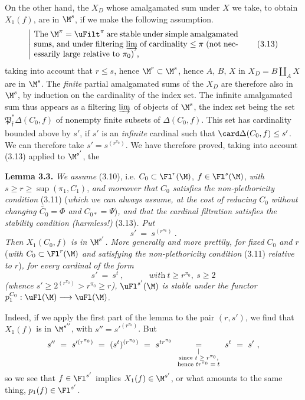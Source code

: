 On the other hand, the $X_D$ whose amalgamated sum under $X$ we take, to obtain $X_1(f)$, are in $\M^s$, if we make the following assumption. 
\[
\left|\ \parbox{0.72\linewidth}{The $\M^\pi=\uFilt^\pi$ are stable under simple amalgamated sums, and under filtering $\varinjlim$ of cardinality $\leq\pi$ (not necessarily large relative to $\pi_0$) ,}\right. \tag*{(3.13)}
\]
taking into account that $r\leq s$, hence $\M^r\subset\M^s$, hence $A$, $B$, $X$ in $X_D=B\amalg_A X$ are in $\M^s$. The \textit{finite} partial amalgamated sums of the $X_D$ are therefore also in $\M^s$, by induction on the cardinality of the index set. The infinite amalgamated sum thus appears as a filtering $\varinjlim$ of objects of $\M^s$, the index set being the set $\mathfrak{P}^*_{\mathfrak{f}}\Delta(C_0,f)$ of nonempty finite subsets of $\Delta(C_0,f)$. This set has cardinality bounded above by $s'$, if $s'$ is an \textit{infinite} cardinal such that $\card\Delta(C_0,f)\leq s'$. We can therefore take $s'=s^{(r^{\pi_0})}$. We have therefore proved, taking into account (3.13) applied to $\M^{s'}$, the %

\textbf{Lemma 3.3.} \textit{We assume} \textup{(3.10), i.e.} $C_0\subset\Fl^r(\M)$, $f\in\Fl^s(\M)$, \textit{with} $s\geq r\geq\sup(\pi_1,C_1)$, \textit{and moreover that $C_0$ satisfies the non-plethoricity condition} \textup{(3.11)} \textup{(}\textit{which we can always assume, at the cost of reducing $C_0$ without changing $\widetilde{C_0}=\Phi$ and $C_{0*}=\Psi$}\textup{)}\textit{, and that the cardinal filtration satisfies the stability condition (harmless!)} \textup{(3.13)}\textit{. Put}
\[
s'\ =\ s^{(r^{\pi_0})}\ . \tag*{(3.14)}
\]
\textit{Then $X_1(C_0,f)$ is in $\M^{s'}$. More generally and more prettily, for fixed $C_0$ and $r$} \textup{(}\textit{with $C_0\subset\Fl^r(\M)$ and satisfying the non-plethoricity condition} \textup{(3.11)} \textit{relative to $r$}\textup{)}\textit{, for every cardinal}  \textit{of the form}
\[
s'\ =\ s^t\ ,\qquad\quad\textit{with}\ t\geq r^{\pi_0},\ s\geq 2 \tag*{(3.15)}
\]
\textit{(whence $s'\geq 2^{(r^{\pi_0})}>r^{\pi_0}\geq r$), $\uFl^{s'}(\M)$ is stable under the functor $p_1^{C_0}:\uFl(\M)\longrightarrow\uFl(\M)$.}

Indeed, if we apply the first part of the lemma to the pair $(r,s')$, we find that $X_1(f)$ is in $\M^{s''}$, with $s''=s'^{(r^{\pi_0})}$. But
\[
s''\ =\ s'^{(r^{\pi_0})}\ =\ (s^t)^{(r^{\pi_0})}\ =\ s^{tr^{\pi_0}}\ \underset{\substack{\vert\\ \text{\scriptsize since $t\geq r^{\pi_0}$,}\\ \text{\scriptsize hence $tr^{\pi_0}=t$}}}{=}\ s^t\ =\ s'\ ,
\]
so we see that $f\in\Fl^{s'}$ implies $X_1(f)\in\M^{s'}$, or what amounts to the same thing, $p_1(f)\in\Fl^{s'}$.

